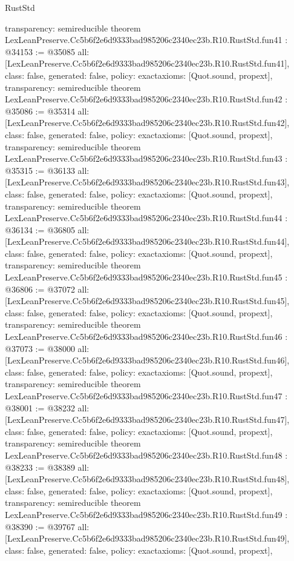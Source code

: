\begin{lexlean}{RustStd}
\begin{coremodule}
{  transparency: semireducible
}
theorem LexLeanPreserve.Cc5b6f2e6d9333bad985206c2340ec23b.R10.RustStd.fun41 : @34153 := @35085 {
  all: [LexLeanPreserve.Cc5b6f2e6d9333bad985206c2340ec23b.R10.RustStd.fun41],
  class: false,
  generated: false,
  policy: exact{axioms: [Quot.sound, propext]},
  transparency: semireducible
}
theorem LexLeanPreserve.Cc5b6f2e6d9333bad985206c2340ec23b.R10.RustStd.fun42 : @35086 := @35314 {
  all: [LexLeanPreserve.Cc5b6f2e6d9333bad985206c2340ec23b.R10.RustStd.fun42],
  class: false,
  generated: false,
  policy: exact{axioms: [Quot.sound, propext]},
  transparency: semireducible
}
theorem LexLeanPreserve.Cc5b6f2e6d9333bad985206c2340ec23b.R10.RustStd.fun43 : @35315 := @36133 {
  all: [LexLeanPreserve.Cc5b6f2e6d9333bad985206c2340ec23b.R10.RustStd.fun43],
  class: false,
  generated: false,
  policy: exact{axioms: [Quot.sound, propext]},
  transparency: semireducible
}
theorem LexLeanPreserve.Cc5b6f2e6d9333bad985206c2340ec23b.R10.RustStd.fun44 : @36134 := @36805 {
  all: [LexLeanPreserve.Cc5b6f2e6d9333bad985206c2340ec23b.R10.RustStd.fun44],
  class: false,
  generated: false,
  policy: exact{axioms: [Quot.sound, propext]},
  transparency: semireducible
}
theorem LexLeanPreserve.Cc5b6f2e6d9333bad985206c2340ec23b.R10.RustStd.fun45 : @36806 := @37072 {
  all: [LexLeanPreserve.Cc5b6f2e6d9333bad985206c2340ec23b.R10.RustStd.fun45],
  class: false,
  generated: false,
  policy: exact{axioms: [Quot.sound, propext]},
  transparency: semireducible
}
theorem LexLeanPreserve.Cc5b6f2e6d9333bad985206c2340ec23b.R10.RustStd.fun46 : @37073 := @38000 {
  all: [LexLeanPreserve.Cc5b6f2e6d9333bad985206c2340ec23b.R10.RustStd.fun46],
  class: false,
  generated: false,
  policy: exact{axioms: [Quot.sound, propext]},
  transparency: semireducible
}
theorem LexLeanPreserve.Cc5b6f2e6d9333bad985206c2340ec23b.R10.RustStd.fun47 : @38001 := @38232 {
  all: [LexLeanPreserve.Cc5b6f2e6d9333bad985206c2340ec23b.R10.RustStd.fun47],
  class: false,
  generated: false,
  policy: exact{axioms: [Quot.sound, propext]},
  transparency: semireducible
}
theorem LexLeanPreserve.Cc5b6f2e6d9333bad985206c2340ec23b.R10.RustStd.fun48 : @38233 := @38389 {
  all: [LexLeanPreserve.Cc5b6f2e6d9333bad985206c2340ec23b.R10.RustStd.fun48],
  class: false,
  generated: false,
  policy: exact{axioms: [Quot.sound, propext]},
  transparency: semireducible
}
theorem LexLeanPreserve.Cc5b6f2e6d9333bad985206c2340ec23b.R10.RustStd.fun49 : @38390 := @39767 {
  all: [LexLeanPreserve.Cc5b6f2e6d9333bad985206c2340ec23b.R10.RustStd.fun49],
  class: false,
  generated: false,
  policy: exact{axioms: [Quot.sound, propext]},
}
\end{coremodule}
\end{lexlean}
